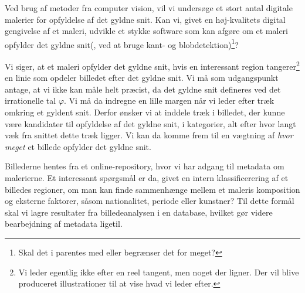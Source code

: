 Ved brug af metoder fra computer vision, vil vi undersøge et stort antal
digitale malerier for opfyldelse af det gyldne snit. Kan vi, givet en
høj-kvalitets digital gengivelse af et maleri, udvikle et stykke software som
kan afgøre om et maleri opfylder det gyldne snit(, ved at bruge kant- og
blobdetektion)\footnote{Skal det i parentes med eller begrænser det for
meget?}?

Vi siger, at et maleri opfylder det gyldne snit, hvis en interessant region
tangerer\footnote{Vi leder egentlig ikke efter en reel tangent, men noget der
ligner. Der vil blive produceret illustrationer til at vise hvad vi leder
efter.} en linie som opdeler billedet efter det gyldne snit. Vi må som
udgangspunkt antage, at vi ikke kan måle helt præcist, da det gyldne snit
defineres ved det irrationelle tal $\varphi$. Vi må da indregne en lille margen
når vi leder efter træk omkring et gyldent snit.  Derfor ønsker vi at inddele
træk i billedet, der kunne være kandidater til opfyldelse af det gyldne snit, i
kategorier, alt efter hvor langt væk fra snittet dette træk ligger. Vi kan da
komme frem til en vægtning af \emph{hvor meget} et billede opfylder det gyldne
snit.

Billederne hentes fra et online-repository, hvor vi har adgang til metadata om
malerierne. Et interessant spørgsmål er da, givet en intern klassificerering af
et billedes regioner, om man kan finde sammenhænge mellem et maleris
komposition og eksterne faktorer, såsom nationalitet, periode eller kunstner?
Til dette formål skal vi lagre resultater fra billedeanalysen i en database,
hvilket gør videre bearbejdning af metadata ligetil.
